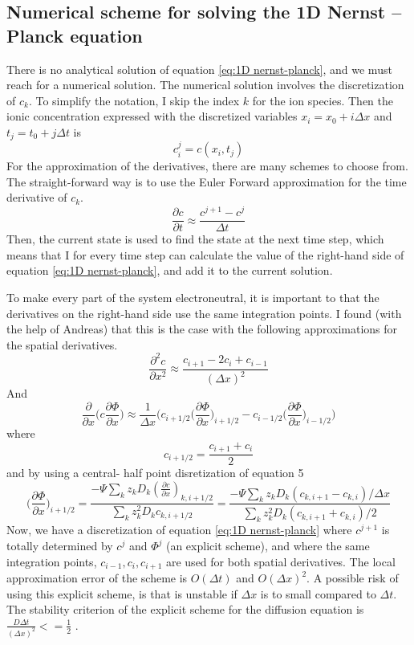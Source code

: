 \documentclass{article}
\begin{document}
\subsection{Numerical scheme for solving the 1D Nernst -- Planck equation}\label{Numerical scheme}
There is no analytical solution of equation \ref{eq:1D nernst-planck}, and we must reach for a numerical solution. The numerical solution involves the discretization of $c_k$. To simplify the notation, I skip the index $k$ for the ion species. Then the ionic concentration expressed with the discretized variables $x_i = x_0 +i \Delta x$ and $t_j = t_0 + j \Delta t$ is 
$$c_i^j = c(x_i, t_j)$$
For the approximation of the derivatives, there are many schemes to choose from. The straight-forward way is to use the Euler Forward approximation for the time derivative of $c_k$.
$$\frac{\partial c}{\partial t} \approx \frac{c^{j+1}-c^j}{\Delta t}$$
Then, the current state is used to find the state at the next time step, which means that I for every time step can calculate the value of the right-hand side of equation \ref{eq:1D nernst-planck}, and add it to the current solution. 

To make every part of the system electroneutral, it is important to that the derivatives on the right-hand side use the same integration points. I found (with the help of Andreas) that this is the case with the following approximations for the spatial derivatives. 
$$\frac{\partial^2 c}{\partial x^2} \approx \frac{c_{i+1}-2c_i+c_{i-1}}{(\Delta x)^2}$$
And 
$$\frac{\partial }{\partial x}  \bigg(c \frac{\partial \Phi}{\partial x} \bigg)\approx \frac{1}{\Delta x}\bigg( c_{i+1/2} \big(\frac{\partial \Phi}{\partial x}\big)_{i+1/2} -  c_{i-1/2} \big(\frac{\partial \Phi}{\partial x}\big)_{i-1/2} \bigg) $$
where 
$$c_{i+ 1/2} = \frac{c_{i+1}+ c_i}{2}$$
and by using a central- half point disretization of equation 5
\begin{equation}\label{eq:gradPhi}
\big(\frac{\partial \Phi}{\partial x}\big)_{i+1/2} = \frac{-\Psi \sum_k z_k D_k (\frac{\partial c}{\partial x})_{k,i+1/2}}{\sum_k z_k^2 D_k c_{k,i+1/2}}= \frac{-\Psi \sum_k z_k D_k (c_{k,i+1}-c_{k,i})/\Delta x }{\sum_k z_k^2 D_k (c_{k,i+1}+c_{k,i})/2}
\end{equation}
Now, we have a discretization of equation \ref{eq:1D nernst-planck} where $c^{j+1}$ is totally determined by $c^j$ and $\Phi^j$ (an explicit scheme), and where the same integration points, $c_{i-1}, c_i, c_{i+1}$ are used for both spatial derivatives. The local approximation error of the scheme is $O(\Delta t)$ and $O(\Delta x)^2$. A possible risk of using this explicit scheme, is that is unstable if $\Delta x$ is to small compared to $\Delta t$. The stability criterion of the explicit scheme for the diffusion equation is $\frac{D\Delta t}{(\Delta x)^2} <= \frac{1}{2}$ \cite{lecturenotes}.
\end{document}
